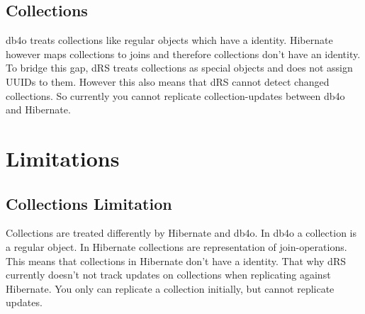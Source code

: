\subsection*{Collections}

db4o treats collections like regular objects which have a identity. Hibernate however maps collections to joins and therefore collections don't have an identity. To bridge this gap, dRS treats collections as special objects and does not assign UUIDs to them. However this also means that dRS cannot detect changed collections. So currently you cannot replicate collection-updates between db4o and Hibernate.

\section{Limitations}
\label{drs:db4o-replication-system-drs-db4o-rdbms-limitations}

\subsection*{Collections Limitation}

Collections are treated differently by Hibernate and db4o. In db4o a collection is a regular object. In Hibernate collections are representation of join-operations. This means that collections in Hibernate don't have a identity. That why dRS currently doesn't not track updates on collections when replicating against Hibernate. You only can replicate a collection initially, but cannot replicate updates.

